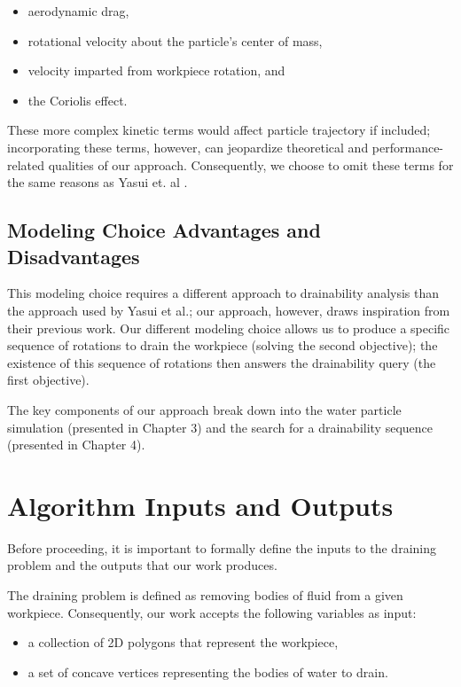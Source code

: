 \begin{itemize}
\item aerodynamic drag,
\item rotational velocity about the particle's center of mass,
\item velocity imparted from workpiece rotation, and
\item the Coriolis effect.
\end{itemize}

These more complex kinetic terms would affect particle trajectory if included; incorporating these terms, however, can jeopardize theoretical and performance-related qualities of our approach. Consequently, we choose to omit these terms for the same reasons as Yasui et. al \cite{Yasui2011}.

	\subsection{Modeling Choice Advantages and Disadvantages}

This modeling choice requires a different approach to drainability analysis than the approach used by Yasui et al.; our approach, however, draws inspiration from their previous work. Our different modeling choice allows us to produce a specific sequence of rotations to drain the workpiece (solving the second objective); the existence of this sequence of rotations then answers the drainability query (the first objective).

The key components of our approach break down into the water particle simulation (presented in Chapter 3) and the search for a drainability sequence (presented in Chapter 4).

\section{Algorithm Inputs and Outputs}

Before proceeding, it is important to formally define the inputs to the draining problem and the outputs that our work produces.

The draining problem is defined as removing bodies of fluid from a given workpiece. Consequently, our work accepts the following variables as input:

\begin{itemize}
\item a collection of 2D polygons that represent the workpiece,
\item a set of concave vertices representing the bodies of water to drain.
\end{itemize}

